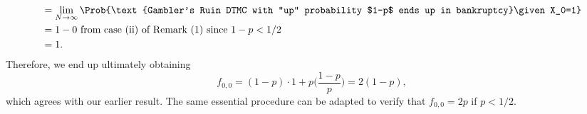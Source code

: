 \begin{enumerate}[(1)]
\begin{align*}
                   & =\lim\limits_{{N} \to {\infty}}\Prob{\text{Gambler's Ruin DTMC with ``up'' probability $1-p$ ends up in bankruptcy}\given X_0=1} \\
                   & =1-0\text{ from case (ii) of Remark (1) since $1-p<1/2$}                                                                         \\
                   & =1.
            \end{align*}
            Therefore, we end up ultimately obtaining
            \[ f_{0,0}=(1-p)\cdot 1+p\biggl(\frac{1-p}{p}\biggr)=2(1-p), \]
            which agrees with our earlier result. The same essential procedure can be adapted to verify
            that $ f_{0,0}=2p $ if $ p<1/2 $.
\end{enumerate}